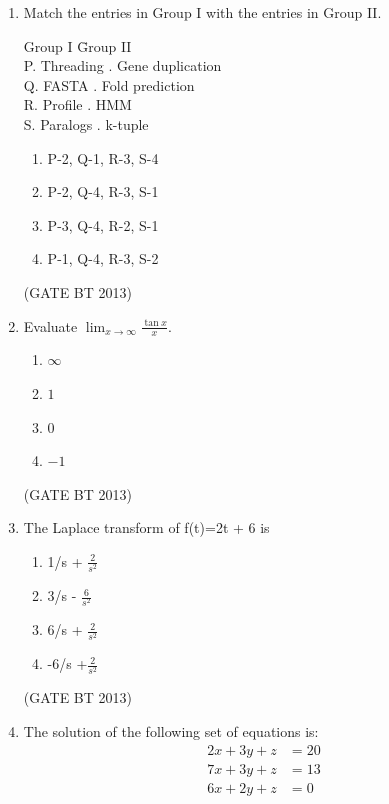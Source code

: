 \documentclass[journal,12pt,onecolumn]{IEEEtran}
\theoremstyle{remark}
\begin{document}
\begin{enumerate}
\item 

Match the entries in Group I with the entries in Group II.

\begin{tabbing}
Group I \hspace{3.5cm} \= Group II \\
P. Threading . Gene duplication \\
Q. FASTA . Fold prediction \\
R. Profile . HMM \\
S. Paralogs . k-tuple \\
\end{tabbing}

\begin{enumerate}
    \item P-2, Q-1, R-3, S-4
    \item P-2, Q-4, R-3, S-1
    \item P-3, Q-4, R-2, S-1
    \item P-1, Q-4, R-3, S-2
\end{enumerate} \hfill(GATE BT 2013)

\item 

Evaluate \(\displaystyle \lim_{x \to \infty} \frac{\tan x}{x}\).

\begin{enumerate}
    \item \(\infty\)
    \item $1$
    \item $0$
    \item $-1$
\end{enumerate} \hfill(GATE BT 2013)

\item 

The Laplace transform of f(t)=2t + 6 is 

\begin{enumerate}
    \item 1/s + \( \frac{2}{s^2} \)
    \item 3/s - \(\frac{6}{s^2}\)
    \item 6/s + \(\frac{2}{s^2}\)
    \item -6/s +\(\frac{2}{s^2}\)

\end{enumerate} \hfill(GATE BT 2013)

\item 

The solution of the following set of equations is:
\[
\begin{aligned}
2x + 3y + z &= 20 \\
7x + 3y + z &= 13 \\
6x + 2y + z &= 0
\end{aligned}
\]


\end{enumerate}
\end{document}
